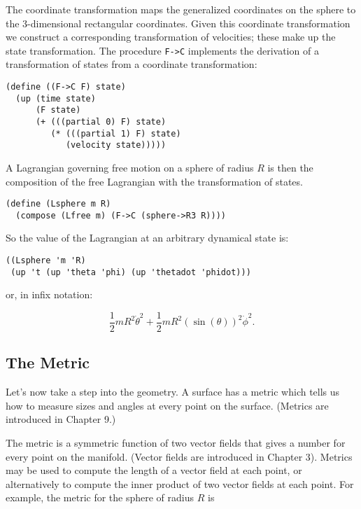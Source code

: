 \documentclass[11pt]{article}
\begin{document}
The coordinate transformation maps the generalized coordinates on the sphere to
the 3-dimensional rectangular coordinates. Given this coordinate transformation
we construct a corresponding transformation of velocities; these make up the
state transformation. The procedure \texttt{F->C} implements the derivation of a
transformation of states from a coordinate transformation:

\begin{verbatim}
(define ((F->C F) state)
  (up (time state)
      (F state)
      (+ (((partial 0) F) state)
         (* (((partial 1) F) state)
            (velocity state)))))
\end{verbatim}

A Lagrangian governing free motion on a sphere of radius \(R\) is then the
composition of the free Lagrangian with the transformation of states.

\begin{verbatim}
(define (Lsphere m R)
  (compose (Lfree m) (F->C (sphere->R3 R))))
\end{verbatim}

So the value of the Lagrangian at an arbitrary dynamical state is:

\begin{verbatim}
((Lsphere 'm 'R)
 (up 't (up 'theta 'phi) (up 'thetadot 'phidot)))
\end{verbatim}

or, in infix notation:

\begin{equation}
\frac{1}{2} mR^2\dot{\theta}^2 +
\frac{1}{2}mR^2\left(\sin\left(\theta\right)\right)^2\dot{\phi}^2.
\end{equation}

\subsection{The Metric}
\label{sec:org49d5654}

Let's now take a step into the geometry. A surface has a metric which tells us
how to measure sizes and angles at every point on the surface. (Metrics are
introduced in Chapter 9.)

The metric is a symmetric function of two vector fields that gives a number for
every point on the manifold. (Vector fields are introduced in Chapter 3).
Metrics may be used to compute the length of a vector field at each point, or
alternatively to compute the inner product of two vector fields at each point.
For example, the metric for the sphere of radius \(R\) is
\end{document}
